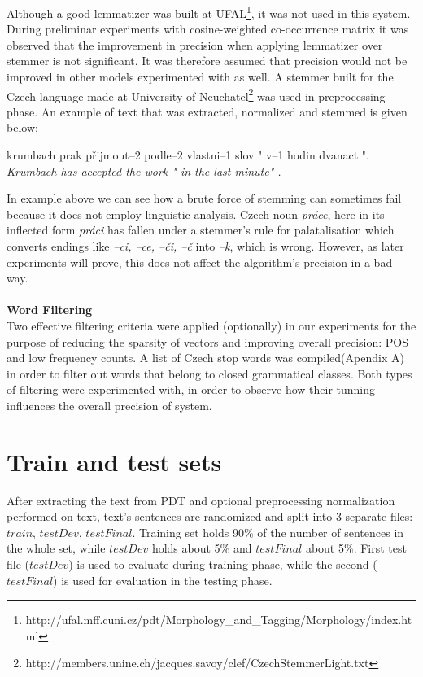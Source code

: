 Although a good lemmatizer was built at 
UFAL\footnote{http://ufal.mff.cuni.cz/pdt/Morphology\_and\_Tagging/Morphology/index.html}, it was not 
used 
in this system. During preliminar experiments with cosine-weighted co-occurrence matrix it was observed 
that the improvement in precision when applying lemmatizer over stemmer is not significant. It was 
therefore
assumed that precision would not be improved in other models experimented with as well. 
A stemmer built for the Czech language made at University of 
Neuchatel\footnote{http://members.unine.ch/jacques.savoy/clef/CzechStemmerLight.txt} was used in 
preprocessing 
phase.  An example of text that 
was extracted, normalized and stemmed is given below:
\begin{examples}
\item krumbach prak p\v{r}ijmout--2 podle--2 vlastni--1 slov " v--1 hodin dvanact ". 
\glt \textit{  Krumbach has accepted the work " in the last minute"  .} 
\end{examples}
In example above we can see how a brute force of stemming can sometimes fail because it does not employ linguistic analysis. Czech noun  \textit{pr\'ace}, here in its inflected form \textit{pr\'aci} has fallen under a stemmer's rule for palatalisation which converts endings like \textit{--ci, --ce, --\v{c}i, --\v{c}} into \textit{--k}, which is wrong. However, as later experiments will prove, this does not affect the algorithm's precision in a bad way.  
\\\\  \textbf{Word Filtering}
\\Two effective filtering criteria were applied (optionally) in our experiments for the purpose of reducing the sparsity of vectors and improving overall precision: POS and low frequency counts. A list of Czech stop words was compiled(Apendix A) in order to filter out words that belong to closed grammatical classes. Both types of filtering were experimented with, in order to observe how their tunning influences the overall precision of system.

\section{Train and test sets}\label{trainTestSet}

After extracting the text from PDT and optional preprocessing normalization performed on text, text's 
sentences are randomized and split into 3 separate files: $train$, $testDev$, $testFinal$. Training set holds 
90\% of the number of sentences in the whole set, while $testDev$ holds about 5\% and $testFinal$ 
about 5\%. First test file 
($testDev$) is used to evaluate during training phase, while the second ($ testFinal$) is used for 
evaluation in the testing phase. 

